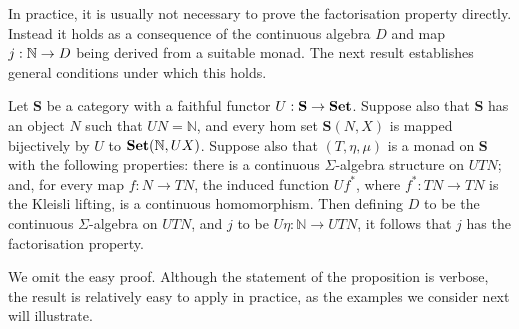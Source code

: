 In practice, it is usually not necessary to prove the factorisation property directly. Instead  it holds as a consequence of the continuous algebra $D$ and map $j: \mathbb{N} \to D$ being derived from a suitable monad. The next result establishes general conditions under which this holds.
\begin{proposition}
\label{proposition:monad}
Let $\mathbf{S}$ be a category with a faithful functor $U : \mathbf{S} \to \mathbf{Set}$. Suppose also that 
$\mathbf{S}$ has an object $N$ such that $UN = \mathbb{N}$, and every hom set $\mathbf{S}(N,X)$
is mapped bijectively by $U$ to $\mathbf{Set}(\mathbb{N},UX)$. Suppose also that $(T,\eta,\mu)$ is a monad on $\mathbf{S}$
with the following properties: there is a continuous $\Sigma$-algebra structure on $UTN$; and, for 
every map $f \colon N \to TN$, the induced function $Uf^*$, where 
$f^* \colon TN \to TN$ is the Kleisli lifting, is a continuous  homomorphism.
Then defining $D$ to be the continuous $\Sigma$-algebra on $U T N$, and
$j$ to be $U\eta \colon \mathbb{N} \to UTN$, it follows that $j$ has the factorisation property.
\end{proposition}



\noindent
We omit the easy proof. 
Although the statement of the proposition is verbose, the result is relatively easy to apply in practice, as the examples we consider next will illustrate.

%
%

